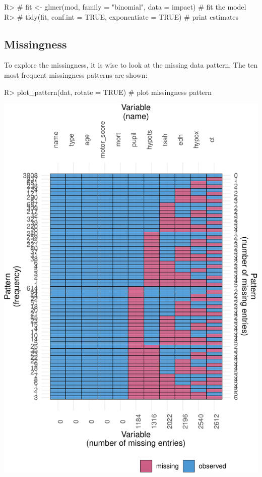 \documentclass[
]{jss}
\begin{document}
\begin{CodeChunk}
\begin{CodeInput}
R> # fit <- glmer(mod, family = "binomial", data = impact) # fit the model
R> # tidy(fit, conf.int = TRUE, exponentiate = TRUE)       # print estimates
\end{CodeInput}
\end{CodeChunk}

\hypertarget{missingness}{%
\subsection{Missingness}\label{missingness}}

To explore the missingness, it is wise to look at the missing data
pattern. The ten most frequent missingness patterns are shown:

\begin{CodeChunk}
\begin{CodeInput}
R> plot_pattern(dat, rotate = TRUE)  # plot missingness pattern
\end{CodeInput}


\begin{center}\includegraphics{Imputation_of_Incomplete_Multilevel_Data_files/figure-latex/pattern-1} \end{center}

\end{CodeChunk}
\end{document}
